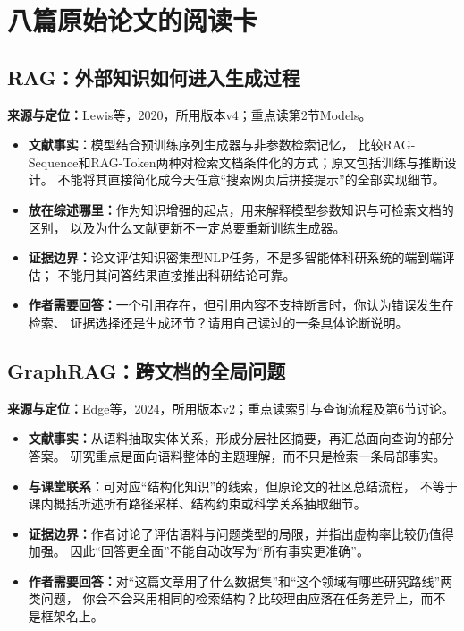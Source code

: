 \documentclass[UTF8,fontset=fandol,12pt,a4paper]{ctexart}
\begin{document}
\clearpage
\section{八篇原始论文的阅读卡}
\subsection{RAG：外部知识如何进入生成过程}
\noindent\textbf{来源与定位：}Lewis等，2020，所用版本v4；重点读第2节Models\cite{rag}。
\begin{itemize}
\item \textbf{文献事实：}模型结合预训练序列生成器与非参数检索记忆，
比较RAG-Sequence和RAG-Token两种对检索文档条件化的方式；原文包括训练与推断设计。
不能将其直接简化成今天任意“搜索网页后拼接提示”的全部实现细节。
\item \textbf{放在综述哪里：}作为知识增强的起点，用来解释模型参数知识与可检索文档的区别，
以及为什么文献更新不一定总要重新训练生成器。
\item \textbf{证据边界：}论文评估知识密集型NLP任务，不是多智能体科研系统的端到端评估；
不能用其问答结果直接推出科研结论可靠。
\item \textbf{作者需要回答：}一个引用存在，但引用内容不支持断言时，你认为错误发生在检索、
证据选择还是生成环节？请用自己读过的一条具体论断说明。
\end{itemize}

\subsection{GraphRAG：跨文档的全局问题}
\noindent\textbf{来源与定位：}Edge等，2024，所用版本v2；重点读索引与查询流程及第6节讨论\cite{graphrag}。
\begin{itemize}
\item \textbf{文献事实：}从语料抽取实体关系，形成分层社区摘要，再汇总面向查询的部分答案。
研究重点是面向语料整体的主题理解，而不只是检索一条局部事实。
\item \textbf{与课堂联系：}可对应“结构化知识”的线索，但原论文的社区总结流程，
不等于课内概括所述所有路径采样、结构约束或科学关系抽取细节。
\item \textbf{证据边界：}作者讨论了评估语料与问题类型的局限，并指出虚构率比较仍值得加强。
因此“回答更全面”不能自动改写为“所有事实更准确”。
\item \textbf{作者需要回答：}对“这篇文章用了什么数据集”和“这个领域有哪些研究路线”两类问题，
你会不会采用相同的检索结构？比较理由应落在任务差异上，而不是框架名上。
\end{itemize}
\end{document}
